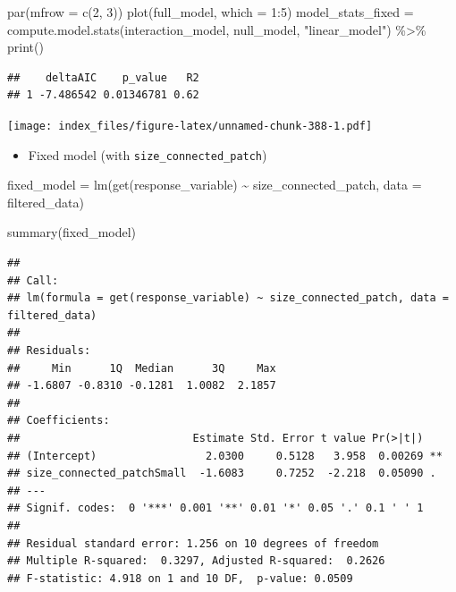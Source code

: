 \documentclass[
]{article}
\newenvironment{Shaded}{\begin{snugshade}}{\end{snugshade}}
\newcommand{\AttributeTok}[1]{\textcolor[rgb]{0.77,0.63,0.00}{#1}}
\newcommand{\DecValTok}[1]{\textcolor[rgb]{0.00,0.00,0.81}{#1}}
\newcommand{\FunctionTok}[1]{\textcolor[rgb]{0.00,0.00,0.00}{#1}}
\newcommand{\NormalTok}[1]{#1}
\newcommand{\OtherTok}[1]{\textcolor[rgb]{0.56,0.35,0.01}{#1}}
\newcommand{\SpecialCharTok}[1]{\textcolor[rgb]{0.00,0.00,0.00}{#1}}
\newcommand{\StringTok}[1]{\textcolor[rgb]{0.31,0.60,0.02}{#1}}
\providecommand{\tightlist}{%
  \setlength{\itemsep}{0pt}\setlength{\parskip}{0pt}}
\begin{document}
\begin{Shaded}
\begin{Highlighting}[]
\FunctionTok{par}\NormalTok{(}\AttributeTok{mfrow =} \FunctionTok{c}\NormalTok{(}\DecValTok{2}\NormalTok{, }\DecValTok{3}\NormalTok{))}
\FunctionTok{plot}\NormalTok{(full\_model, }\AttributeTok{which =} \DecValTok{1}\SpecialCharTok{:}\DecValTok{5}\NormalTok{)}
\NormalTok{model\_stats\_fixed }\OtherTok{=} \FunctionTok{compute.model.stats}\NormalTok{(interaction\_model,}
\NormalTok{                                        null\_model,}
                                        \StringTok{"linear\_model"}\NormalTok{) }\SpecialCharTok{\%\textgreater{}\%}
  \FunctionTok{print}\NormalTok{()}
\end{Highlighting}
\end{Shaded}

\begin{verbatim}
##    deltaAIC    p_value   R2
## 1 -7.486542 0.01346781 0.62
\end{verbatim}

\texttt{[image: index\_files/figure-latex/unnamed-chunk-388-1.pdf]}

\begin{itemize}
\tightlist
\item
  Fixed model (with \texttt{size\_connected\_patch})
\end{itemize}

\begin{Shaded}
\begin{Highlighting}[]
\NormalTok{fixed\_model }\OtherTok{=} \FunctionTok{lm}\NormalTok{(}\FunctionTok{get}\NormalTok{(response\_variable) }\SpecialCharTok{\textasciitilde{}}
\NormalTok{                   size\_connected\_patch,}
                 \AttributeTok{data =}\NormalTok{ filtered\_data)}

\FunctionTok{summary}\NormalTok{(fixed\_model)}
\end{Highlighting}
\end{Shaded}

\begin{verbatim}
## 
## Call:
## lm(formula = get(response_variable) ~ size_connected_patch, data = filtered_data)
## 
## Residuals:
##     Min      1Q  Median      3Q     Max 
## -1.6807 -0.8310 -0.1281  1.0082  2.1857 
## 
## Coefficients:
##                           Estimate Std. Error t value Pr(>|t|)   
## (Intercept)                 2.0300     0.5128   3.958  0.00269 **
## size_connected_patchSmall  -1.6083     0.7252  -2.218  0.05090 . 
## ---
## Signif. codes:  0 '***' 0.001 '**' 0.01 '*' 0.05 '.' 0.1 ' ' 1
## 
## Residual standard error: 1.256 on 10 degrees of freedom
## Multiple R-squared:  0.3297, Adjusted R-squared:  0.2626 
## F-statistic: 4.918 on 1 and 10 DF,  p-value: 0.0509
\end{verbatim}
\end{document}
